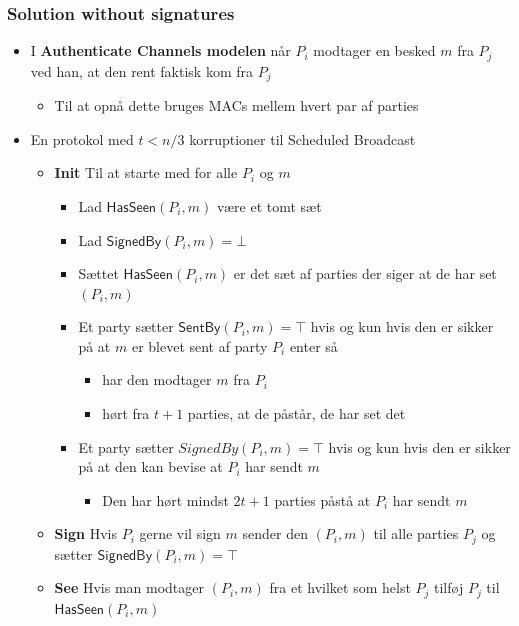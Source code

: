 \documentclass[a4, english]{article}
\begin{document}
\subsubsection{Solution without signatures}
\begin{itemize}
  \item I \textbf{Authenticate Channels modelen} når $P_i$ modtager en besked $m$ fra $P_j$ ved han, at den rent faktisk kom fra $P_j$   
  \begin{itemize}
  	\item Til at opnå dette bruges MACs mellem hvert par af parties
  \end{itemize}
  \item En protokol med $t < n/3$ korruptioner til Scheduled Broadcast
  \begin{itemize}
  	\item \textbf{Init} Til at starte med for alle $P_i$ og $m$ 
    \begin{itemize}
    	\item Lad $\mathsf{HasSeen}(P_i,m)$ være et tomt sæt
      \item Lad $\mathsf{SignedBy}(P_i,m) = \bot$ 
      \item Sættet $\mathsf{HasSeen}(P_i,m)$ er det sæt af parties der siger at de har set $(P_i,m)$ 
      \item Et party sætter $\mathsf{SentBy}(P_i,m) = \top$ hvis og kun hvis den er sikker på at $m$ er blevet sent af party $P_i$ enter så
      \begin{itemize}
      	\item har den modtager $m$ fra $P_i$ 
        \item hørt fra $t+1$ parties, at de påstår, de har set det
      \end{itemize}
      \item Et party sætter $SignedBy(P_i,m) = \top$ hvis og kun hvis den er sikker på at den kan bevise at $P_i$ har sendt $m$ 
      \begin{itemize}
      	\item Den har hørt mindst $2t+1$ parties påstå at $P_i$ har sendt $m$  
      \end{itemize}      
    \end{itemize}
    \item \textbf{Sign} Hvis $P_i$ gerne vil sign $m$ sender den $(P_i,m)$ til alle parties $P_j$ og sætter $\mathsf{SignedBy}(P_i,m) = \top$ 
    \item \textbf{See} Hvis man modtager $(P_i,m)$ fra et hvilket som helst $P_j$ tilføj $P_j$ til $\mathsf{HasSeen}(P_i,m)$ 

\end{itemize}
\end{itemize}
\end{document}

